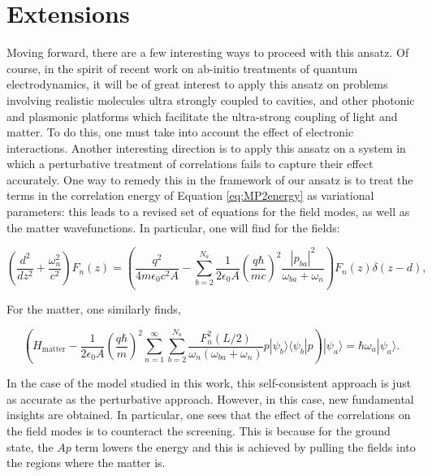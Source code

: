 \documentclass[aps,prb,twocolumn,
	groupedaddress,superscriptaddress,
	amsfonts,amssymb,amsmath,floatfix,
	citeautoscript]{revtex4-1}
\begin{document}
\section{Extensions}
\label{sec:extensions}
Moving forward, there are a few interesting ways to proceed with this ansatz. Of course, in the spirit of recent work on ab-initio treatments of quantum electrodynamics, it will be of great interest to apply this ansatz on problems involving realistic molecules ultra strongly coupled to cavities, and other photonic and plasmonic platforms which facilitate the ultra-strong coupling of light and matter. To do this, one must take into account the effect of electronic interactions. Another interesting direction is to apply this ansatz on a system in which a perturbative treatment of correlations fails to capture their effect accurately. One way to remedy this in the framework of our ansatz is to treat the terms in the correlation energy of Equation \ref{eq:MP2energy} as variational parameters: this leads to a revised set of equations for the field modes, as well as the matter wavefunctions. In particular, one will find for the fields:
\begin{widetext}
\begin{equation}\label{eq:self_consistent_maxwell}
\left(\frac{d^2}{dz^2} + \frac{\omega_n^2}{c^2} \right)F_n(z) = \left(\frac{q^2}{4m\epsilon_0 c^2 A} - \sum\limits_{b=2}^{N_a}\frac{1}{2\epsilon_0 A}\left( \frac{q\hbar}{mc}\right)^2\frac{|p_{ba}|^2}{\omega_{ba}+\omega_n}\right)F_n(z)\delta(z-d),
\end{equation}
\end{widetext}
For the matter, one similarly finds,
\begin{widetext}
\begin{equation}\label{eq:self_consistent_matter}
\left(H_{\mathrm{matter}} - \frac{1}{2\epsilon_0 A}\left(\frac{q\hbar}{m}\right)^2\sum\limits_{n=1}^{\infty}\sum\limits_{b=2}^{N_a}\frac{F^2_n(L/2)}{\omega_n(\omega_{ba}+\omega_n)}p|\psi_b\rangle\langle \psi_b|p\right)|\psi_a\rangle = \hbar\omega_a|\psi_a\rangle.
\end{equation}
\end{widetext}
In the case of the model studied in this work, this self-consistent approach is just as accurate as the perturbative approach. However, in this case, new fundamental insights are obtained. In particular, one sees that the effect of the correlations on the field modes is to counteract the screening. This is because for the ground state, the $Ap$ term lowers the energy and this is achieved by pulling the fields into the regions where the matter is.
\end{document}
